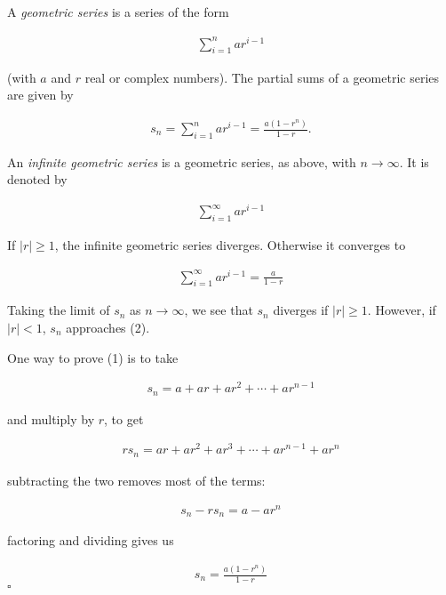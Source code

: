 \documentclass[12pt]{article}
\begin{document}
A \emph{geometric series} is a series of the form

\begin{align*}
\sum_{i=1}^n ar^{i-1}
\end{align*}

(with $a$ and $r$ real or complex numbers).  The partial sums of a geometric series are given by

\begin{align}
s_n=\sum_{i=1}^n ar^{i-1} =  \frac{a(1 -r^n)}{1-r}.
\end{align}

An \emph{infinite geometric series} is a geometric series, as above, with $n \rightarrow \infty$.  It is denoted by

\begin{align*}
\sum_{i=1}^\infty ar^{i-1}
\end{align*}

If $|r|\ge 1$, the infinite geometric series diverges.  Otherwise it converges to

\begin{align}
\sum_{i=1}^\infty ar^{i-1}  =  \frac{a}{1-r}
\end{align}

Taking the limit of $s_n$ as  $n \rightarrow \infty$, we see that $s_n$ diverges if $|r| \ge 1$.  However, if $|r| < 1$, $s_n$ approaches (2).

One way to prove (1) is to take 

\begin{align*}
s_n  =  a + ar + ar^2 + \cdots + ar^{n-1}
\end{align*}

and multiply by $r$, to get

\begin{align*}
 r s_n  =  ar + ar^2 + ar^3 + \cdots + ar^{n-1} + ar^{n}
\end{align*}

subtracting the two removes most of the terms:

\begin{align*}
 s_n - rs_n  =  a - ar^n
\end{align*}

factoring and dividing gives us

\begin{align*}
s_n = \frac{a(1 -r^n)}{1-r}
\end{align*}
$\square$
\end{document}

